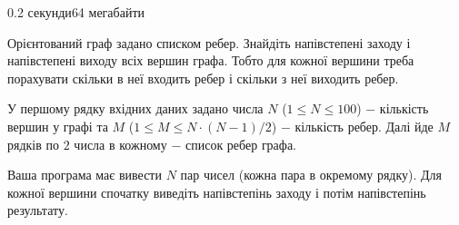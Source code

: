 \begin{problem}{}{}{}{0.2 секунди}{64 мегабайти}

Орієнтований граф задано списком ребер. Знайдіть напівстепені заходу і напівстепені виходу всіх вершин графа.
Тобто для кожної вершини треба порахувати скільки в неї входить ребер і скільки з неї виходить ребер.

\InputFile
У першому рядку вхідних даних задано числа $N$ ($1 \le N \le 100$) $-$ кількість вершин у графі та 
$M$ ($1 \le M \le N\cdot (N-1)/2$) $-$ кількість ребер.
Далі йде $M$ рядків по $2$ числа в кожному $-$ список ребер графа. 

\OutputFile
Ваша програма має вивести $N$ пар чисел (кожна пара в окремому рядку). Для кожної вершини спочатку виведіть 
напівстепінь заходу і потім напівстепінь результату.

\Example

\begin{example}
%
\end{example}

\end{problem}

